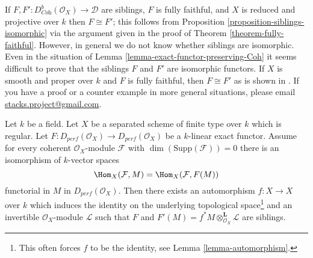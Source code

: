 \begin{remark}
\label{remark-difficult}
If $F, F' : D^b_{\textit{Coh}}(\mathcal{O}_X) \to \mathcal{D}$ are siblings, $F$
is fully faithful, and $X$ is reduced and projective over $k$ then
$F \cong F'$; this follows from
Proposition \ref{proposition-siblings-isomorphic} via the argument
given in the proof of Theorem \ref{theorem-fully-faithful}.
However, in general we do not know whether siblings are isomorphic.
Even in the situation of Lemma \ref{lemma-exact-functor-preserving-Coh}
it seems difficult to prove that the siblings $F$ and $F'$
are isomorphic functors. If $X$ is smooth and proper over $k$
and $F$ is fully faithful, then $F \cong F'$ as is shown in
\cite{Noah}.
If you have a proof or a counter example in more general situations,
please email
\href{mailto:stacks.project@gmail.com}{stacks.project@gmail.com}.
\end{remark}

\begin{lemma}
\label{lemma-preserves-Coh}
Let $k$ be a field. Let $X$ be a separated scheme of finite type over $k$ which
is regular. Let $F : D_{perf}(\mathcal{O}_X) \to D_{perf}(\mathcal{O}_X)$
be a $k$-linear exact functor. Assume for every coherent
$\mathcal{O}_X$-module $\mathcal{F}$ with $\dim(\text{Supp}(\mathcal{F})) = 0$
there is an isomorphism of $k$-vector spaces
$$
\Hom_X(\mathcal{F}, M) = \Hom_X(\mathcal{F}, F(M))
$$
functorial in $M$ in $D_{perf}(\mathcal{O}_X)$. Then there exists an
automorphism $f : X \to X$ over $k$ which induces the identity on the
underlying topological space\footnote{This often forces $f$
to be the identity, see Lemma \ref{lemma-automorphism}.} and an
invertible $\mathcal{O}_X$-module $\mathcal{L}$
such that $F$ and $F'(M) = f^*M \otimes_{\mathcal{O}_X}^\mathbf{L} \mathcal{L}$
are siblings.
\end{lemma}


